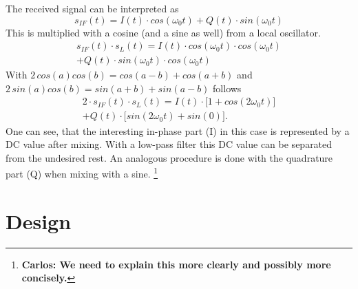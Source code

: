 \documentclass[conference]{IEEEtran}
\newcommand{\cp}[1]{\footnote{{\bf Carlos: #1}}}
\begin{document}
The received signal can be interpreted as
\begin{equation}
	s_{IF}(t)=I(t) \cdot cos(\omega_{0}t) + Q(t) \cdot sin(\omega_{0}t)
\end{equation}     
This is multiplied with a cosine (and a sine as well) from a local oscillator.
\begin{multline}
        s_{IF}(t) \cdot s_L(t) = I(t) \cdot cos(\omega_{0}t) \cdot cos(\omega_{0}t)\\+ Q(t) \cdot sin(\omega_{0}t) \cdot cos(\omega_{0}t)
\end{multline}
With \ensuremath{2\,cos(a)cos(b)=cos(a-b)+cos(a+b)} and \ensuremath{2\,sin(a)cos(b)=sin(a+b)+sin(a-b)} follows
\begin{multline}
        2 \cdot s_{IF}(t) \cdot s_L(t) = I(t) \cdot \bigl[1+cos(2\omega_{0}t)\bigr]\\+ Q(t) \cdot \bigl[sin(2\omega_0t)+sin(0)\bigr].
\end{multline}
One can see, that the interesting in-phase part (I) in this case is represented by a DC value after mixing. With a low-pass filter this DC value can be separated from the undesired rest. An analogous procedure is done with the quadrature part (Q) when mixing with a sine. \cp{We need to explain this more clearly and possibly more concisely.}

\section{Design}
\end{document}
